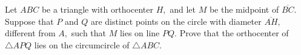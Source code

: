 Let $ABC$ be a triangle with orthocenter $H,$ and let $M$ be the midpoint of $\overline{BC}.$ Suppose that $P$ and $Q$ are distinct points on the circle with diameter $\overline{AH},$ different from $A,$ such that $M$ lies on line $PQ.$ Prove that the orthocenter of $\triangle APQ$ lies on the circumcircle of $\triangle ABC.$

